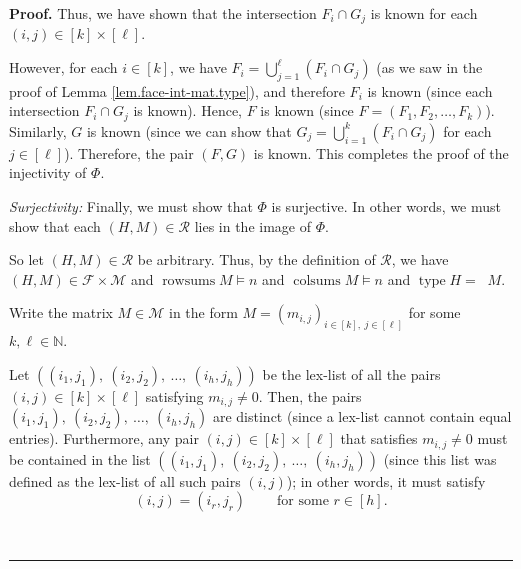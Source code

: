 \documentclass[12pt]{article}
\theoremstyle{definition}%
\theoremstyle{definition}%
\theoremstyle{remark}%
\newcommand{\interval}[1]{\left[ #1 \right]} %
\newcommand{\CF}{\mathcal{F}}
\newcommand{\CM}{\mathcal{M}}
\newcommand{\CR}{\mathcal{R}}
\newcommand{\rowsums}{\operatorname{rowsums}}
\newcommand{\colsums}{\operatorname{colsums}}
\newcommand{\readb}{\mathop{\overline{\operatorname{read}}}}
\newcommand{\type}{\operatorname{type}}
\newenvironment{proof}[1][Proof]{\noindent\textbf{#1.} }{\ \rule{0.5em}{0.5em}}
\begin{document}
\begin{proof}
Thus, we have shown that the intersection $F_{i}\cap G_{j}$ is known for each
$\left(  i,j\right)  \in\interval{k}  \times\interval{\ell}$.

However, for each $i\in\interval{k}  $, we have $F_{i}=\bigcup
\limits_{j=1}^{\ell}\left(  F_{i}\cap G_{j}\right)  $ (as we saw in the proof
of Lemma \ref{lem.face-int-mat.type}), and therefore $F_{i}$ is known (since
each intersection $F_{i}\cap G_{j}$ is known). Hence, $F$ is known (since
$F=\left(  F_{1},F_{2},\ldots,F_{k}\right)  $). Similarly, $G$ is known (since
we can show that $G_{j}=\bigcup\limits_{i=1}^{k}\left(  F_{i}\cap
G_{j}\right)  $ for each $j\in\interval{\ell}$). Therefore, the pair
$\left(  F,G\right)  $ is known. This completes the proof of the injectivity
of $\Phi$. \medskip

\textit{Surjectivity:} Finally, we must show that $\Phi$ is surjective. In
other words, we must show that each $\left(  H,M\right)  \in\CR$ lies
in the image of $\Phi$.

So let $\left(  H,M\right)  \in\CR$ be arbitrary. Thus, by the
definition of $\CR$, we have $\left(  H,M\right)  \in\CF
\times\CM$ and $\rowsums M\models n$ and
$\colsums M\models n$ and $\type H=\readb M$.

Write the matrix $M\in\CM$ in the form $M=\left(  m_{i,j}\right)
_{i\in\interval{k}  ,\ j\in\interval{\ell}}$ for some $k,\ell
\in\mathbb{N}$.

Let $\left(  \left(  i_{1},j_{1}\right)  ,\ \left(  i_{2},j_{2}\right)
,\ \ldots,\ \left(  i_{h},j_{h}\right)  \right)  $ be the lex-list of all the
pairs $\left(  i,j\right)  \in\interval{k}  \times\interval{\ell}$
satisfying $m_{i,j}\neq0$. Then, the pairs $\left(  i_{1},j_{1}\right)
,\ \left(  i_{2},j_{2}\right)  ,\ \ldots,\ \left(  i_{h},j_{h}\right)  $ are
distinct (since a lex-list cannot contain equal entries). Furthermore, any
pair $\left(  i,j\right)  \in\interval{k}  \times\interval{\ell}$
that satisfies $m_{i,j}\neq0$ must be contained in the list $\left(  \left(
i_{1},j_{1}\right)  ,\ \left(  i_{2},j_{2}\right)  ,\ \ldots,\ \left(
i_{h},j_{h}\right)  \right)  $ (since this list was defined as the lex-list of
all such pairs $\left(  i,j\right)  $); in other words, it must satisfy
\begin{equation}
\left(  i,j\right)  =\left(  i_{r},j_{r}\right)  \ \ \ \ \ \ \ \ \ \ \text{for
some }r\in\interval{h} .
\label{pf.lem.face-int-bij.sur.irjr}
\end{equation}



\end{proof}
\end{document}
